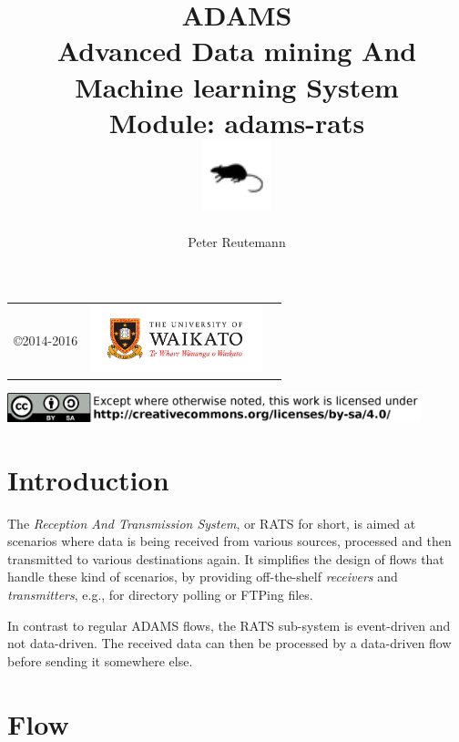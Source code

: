 \documentclass[a4paper]{book}
\title{
  \textbf{ADAMS} \\
  {\Large \textbf{A}dvanced \textbf{D}ata mining \textbf{A}nd \textbf{M}achine
  learning \textbf{S}ystem} \\
  {\Large Module: adams-rats} \\
  \vspace{1cm}
  \includegraphics[width=2cm]{images/rats-module.png} \\
}
\author{
  Peter Reutemann
}
\begin{document}
\begin{titlepage}
\maketitle

\thispagestyle{empty}
\center
\begin{table}[b]
	\begin{tabular}{c l l}
		\parbox[c][2cm]{2cm}{\copyright 2014-2016} &
		\parbox[c][2cm]{5cm}{\includegraphics[width=5cm]{images/coat_of_arms.pdf}}
	\end{tabular}
	\includegraphics[width=12cm]{images/cc.png} \\
\end{table}

\end{titlepage}

\tableofcontents

\chapter{Introduction}
The \textit{Reception And Transmission System}, or RATS for short, is aimed
at scenarios where data is being received from various sources, processed
and then transmitted to various destinations again. It simplifies the design
of flows that handle these kind of scenarios, by providing off-the-shelf
\textit{receivers} and \textit{transmitters}, e.g., for directory polling
or FTPing files.

In contrast to regular ADAMS flows, the RATS sub-system is event-driven
and not data-driven. The received data can then be processed by a data-driven
flow before sending it somewhere else.


\chapter{Flow}
\end{document}
